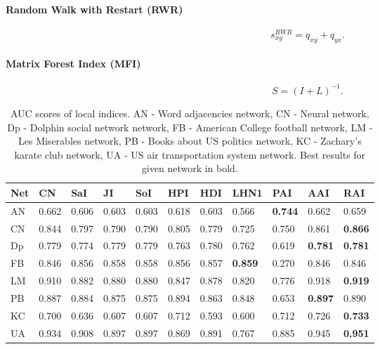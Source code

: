 \documentclass{llncs}
\begin{document}
\paragraph{Random Walk with Restart (RWR)}
%
\begin{equation}
s_{xy}^{RWR} = q_{xy} + q_{yx}.
\end{equation}
%
\paragraph{Matrix Forest Index (MFI) \cite{mf-index}}
%
\begin{equation}
S = (I + L)^{-1}.
\end{equation}
%
\setlength{\tabcolsep}{5pt}
\renewcommand{\arraystretch}{1.5}
\begin{table}
\begin{center}
\caption{AUC scores of local indices. AN - Word adjacencies network\cite{adjnoun-net}, CN - Neural network\cite{celneur-net}, Dp - Dolphin social network network\cite{dolph-net}, FB - American College football network\cite{foot-net}, LM - Les Miserables network\cite{lesmis-net}, PB - Books about US politics network\cite{polbook-net}, KC - Zachary's karate club network\cite{karate-net}, UA - US air transportation system network\cite{usair-net}. Best results for given network in bold.}
\begin{tabular}{| l | l | l | l | l | l | l | l | l | l | l |}
\hline
Net & CN & SaI & JI & SoI & HPI & HDI & LHN1 & PAI & AAI & RAI \\ \hline
AN & 0.662 & 0.606 & 0.603 & 0.603 & 0.618 & 0.603 & 0.566 & \textbf{0.744} & 0.662 & 0.659 \\ \hline
CN & 0.844 & 0.797 & 0.790 & 0.790 & 0.805 & 0.779 & 0.725 & 0.750 & 0.861 & \textbf{0.866} \\ \hline
Dp & 0.779 & 0.774 & 0.779 & 0.779 & 0.763 & 0.780 & 0.762 & 0.619 & \textbf{0.781} & \textbf{0.781} \\ \hline
FB & 0.846 & 0.856 & 0.858 & 0.858 & 0.856 & 0.857 & \textbf{0.859} & 0.270 & 0.846 & 0.846 \\ \hline
LM & 0.910 & 0.882 & 0.880 & 0.880 & 0.847 & 0.878 & 0.820 & 0.776 & 0.918 & \textbf{0.919} \\ \hline
PB & 0.887 & 0.884 & 0.875 & 0.875 & 0.894 & 0.863 & 0.848 & 0.653 & \textbf{0.897} & 0.890 \\ \hline
KC & 0.700 & 0.636 & 0.607 & 0.607 & 0.712 & 0.593 & 0.600 & 0.712 & 0.726 & \textbf{0.733} \\ \hline
UA & 0.934 & 0.908 & 0.897 & 0.897 & 0.869 & 0.891 & 0.767 & 0.885 & 0.945 & \textbf{0.951} \\ 
\hline
\end{tabular}
\end{center}
\end{table}
\end{document}
